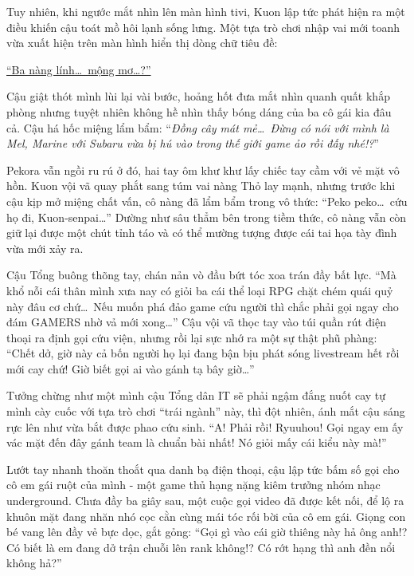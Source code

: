 \documentclass[../main.tex]{subfiles}
\begin{document}
Tuy nhiên, khi ngước mắt nhìn lên màn hình tivi, Kuon lập tức phát hiện ra một điều khiến cậu toát mồ hôi lạnh sống lưng. Một tựa trò chơi nhập vai mới toanh vừa xuất hiện trên màn hình hiển thị dòng chữ tiêu đề:

\begin{center}
  \uline{``Ba nàng lính\dots\ mộng mơ\dots?''}
\end{center}

Cậu giật thót mình lùi lại vài bước, hoảng hốt đưa mắt nhìn quanh quất khắp phòng nhưng tuyệt nhiên không hề nhìn thấy bóng dáng của ba cô gái kia đâu cả. Cậu há hốc miệng lẩm bẩm: ``\textit{Đồng cây mát mẻ\dots\ Đừng có nói với mình là Mel, Marine với Subaru vừa bị hú vào trong thế giới game ảo rồi đấy nhé!?}''

Pekora vẫn ngồi ru rú ở đó, hai tay ôm khư khư lấy chiếc tay cầm với vẻ mặt vô hồn. Kuon vội vã quay phắt sang túm vai nàng Thỏ lay mạnh, nhưng trước khi cậu kịp mở miệng chất vấn, cô nàng đã lẩm bẩm trong vô thức: ``Peko peko\dots\ cứu họ đi, Kuon-senpai\dots'' Dường như sâu thẳm bên trong tiềm thức, cô nàng vẫn còn giữ lại được một chút tỉnh táo và có thể mường tượng được cái tai họa tày đình vừa mới xảy ra.

Cậu Tổng buông thõng tay, chán nản vò đầu bứt tóc xoa trán đầy bất lực. ``Mà khổ nỗi cái thân mình xưa nay có giỏi ba cái thể loại RPG chặt chém quái quỷ này đâu cơ chứ\dots\ Nếu muốn phá đảo game cứu người thì chắc phải gọi ngay cho đám GAMERS nhờ vả mới xong\dots'' Cậu vội vã thọc tay vào túi quần rút điện thoại ra định gọi cứu viện, nhưng rồi lại sực nhớ ra một sự thật phũ phàng: ``Chết dở, giờ này cả bốn người họ lại đang bận bịu phát sóng livestream hết rồi mới cay chứ! Giờ biết gọi ai vào gánh tạ bây giờ\dots''

Tưởng chừng như một mình cậu Tổng dân IT sẽ phải ngậm đắng nuốt cay tự mình cày cuốc với tựa trò chơi ``trái ngành'' này, thì đột nhiên, ánh mắt cậu sáng rực lên như vừa bắt được phao cứu sinh.  ``A! Phải rồi! Ryuuhou! Gọi ngay em ấy vác mặt đến đây gánh team là chuẩn bài nhất! Nó giỏi mấy cái kiểu này mà!''

Lướt tay nhanh thoăn thoắt qua danh bạ điện thoại, cậu lập tức bấm số gọi cho cô em gái ruột của mình - một game thủ hạng nặng kiêm trưởng nhóm nhạc underground. Chưa đầy ba giây sau, một cuộc gọi video đã được kết nối, để lộ ra khuôn mặt đang nhăn nhó cọc cằn cùng mái tóc rối bời của cô em gái. Giọng con bé vang lên đầy vẻ bực dọc, gắt gỏng: ``Gọi gì vào cái giờ thiêng này hả ông anh!? Có biết là em đang dở trận chuỗi lên rank không!? Có rớt hạng thì anh đền nổi không hả?''
\end{document}
